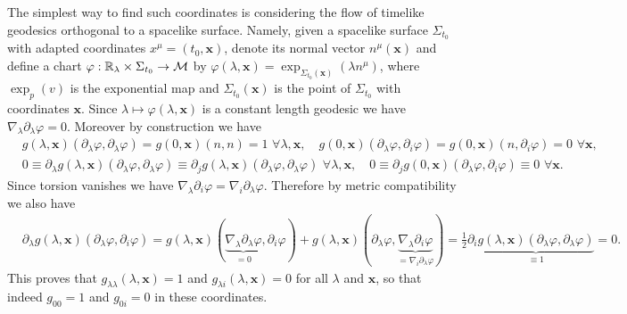 \documentclass[../QFT_main.tex]{subfiles}
\begin{document}
\begin{mytheorem}[Adapted coordinates without space-time cross terms $g_{0i}=0$ and $g_{00}\equiv 1$]
The simplest way to find such coordinates is considering the flow of timelike geodesics orthogonal to a spacelike surface.
Namely, given a spacelike surface $\Sigma_{t_0}$ with adapted coordinates $x^\mu=(t_0,\mathbf{x})$, denote its normal vector $n^\mu(\mathbf{x})$ and define a chart $\varphi:\mathbb{\mathbb{R}}_\lambda\times \Sigma_{t_0}\to\mathcal{M}$ by $\varphi(\lambda,\mathbf{x})=\exp_{\Sigma_{t_0}(\mathbf{x})}(\lambda n^\mu)$, where $\exp_p(v)$ is the exponential map and $\Sigma_{t_0}(\mathbf{x})$ is the point of $\Sigma_{t_0}$ with coordinates $\mathbf{x}$.
Since $\lambda \mapsto \varphi(\lambda,\mathbf{x})$ is a constant length geodesic we have $\nabla_\lambda \partial_\lambda \varphi = 0$.
Moreover by construction we have
{\small\begin{align}
    &g(\lambda,\mathbf{x})(\partial_\lambda\varphi,\partial_\lambda \varphi) = g(0,\mathbf{x})(n,n) = 1 \,\,\forall\lambda,\mathbf{x}, \quad g(0,\mathbf{x})(\partial_\lambda\varphi, \partial_i \varphi) = g(0,\mathbf{x})(n, \partial_i \varphi) = 0\,\,\forall\mathbf{x},\\[3pt]
    & 0\equiv \partial_\lambda g(\lambda,\mathbf{x})(\partial_\lambda\varphi, \partial_\lambda \varphi)\equiv \partial_j g(\lambda,\mathbf{x})(\partial_\lambda\varphi, \partial_\lambda \varphi)\,\,\forall\lambda,\mathbf{x}, 
    \quad 0\equiv \partial_j g(0,\mathbf{x})(\partial_\lambda\varphi, \partial_i \varphi) \equiv 0 \,\,\forall\mathbf{x}.
\end{align}}
Since torsion vanishes we have $\nabla_\lambda \partial_i \varphi = \nabla_i \partial_\lambda \varphi$.
Therefore by metric compatibility we also have
{\small
\begin{align}
    &\partial_\lambda g(\lambda,\mathbf{x})(\partial_\lambda\varphi, \partial_i \varphi) = g(\lambda,\mathbf{x})(\underbrace{ \nabla_\lambda \partial_\lambda \varphi}_{=0},\partial_i \varphi)+ g(\lambda,\mathbf{x})(\partial_\lambda \varphi,\underbrace{\nabla_\lambda \partial_i \varphi}_{=\nabla_i\partial_\lambda\varphi})  = \tfrac{1}{2} \partial_i \underbrace{g(\lambda,\mathbf{x})(\partial_\lambda\varphi, \partial_\lambda \varphi)}_{\equiv 1} = 0.
\end{align}}
This proves that $g_{\lambda \lambda}(\lambda,\mathbf{x})=1$ and $g_{\lambda i}(\lambda,\mathbf{x})=0$ for all $\lambda$ and $\mathbf{x}$, so that indeed $g_{00}=1$ and $g_{0i}=0$ in these coordinates.
\end{mytheorem}
\end{document}
